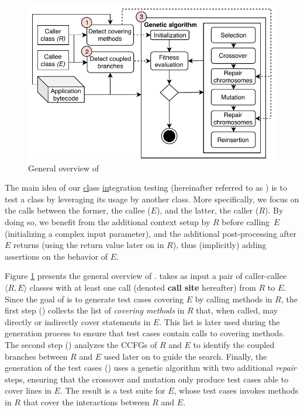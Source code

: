 
\begin{figure}[!t]
    \centering
    \includegraphics[width=\columnwidth]{papers/cling/figures/approach.pdf}
    \caption{General overview of \integration}
    \label{fig:cling:approach}
\end{figure}

The main idea of our \underline{cl}ass \underline{in}tegration testin\underline{g} (hereinafter referred to as \cling) is to test a class by leveraging its usage by another class.
More specifically, we focus on the calls between the former, the callee ($E$), and the latter, the caller ($R$). By doing so, we benefit from the additional context setup by $R$ before calling~$E$ (\eg initializing a complex input parameter), and the additional post-processing after $E$ returns (\eg using the return value later on in $R$), thus (implicitly) adding assertions on the behavior of $E$. 

Figure \ref{fig:cling:approach} presents the general overview of \cling. \cling takes as input a pair of caller-callee $\langle R,E \rangle$ classes with at least one call (denoted \textbf{call site} hereafter) from $R$ to $E$. Since the goal of \cling is to generate test cases covering $E$ by calling methods in $R$, the first step () collects the list of \textit{covering methods} in $R$ that, when called, may directly or indirectly cover statements in $E$. This list is later used  during the generation process to ensure that test cases contain calls to covering methods. The second step () analyzes the CCFGs of $R$ and $E$ to identify the coupled branches between $R$ and $E$ used later on to guide the search. Finally, the generation of the test cases  () uses a genetic algorithm with two additional \textit{repair} steps, ensuring that the crossover and mutation only produce test cases able to cover lines in $E$. The result is a test suite for $E$, whose test cases invokes methods in $R$ that cover the interactions between $R$ and $E$.

